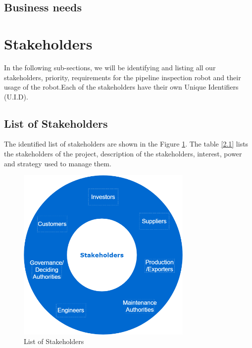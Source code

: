 \documentclass[a4paper,table]{article}
\begin{document}
 \subsection{Business needs}
\section{Stakeholders}
In the following sub-sections, we will be identifying and listing all our stakeholders, priority, requirements for the pipeline inspection robot and their usage of the robot.Each of the stakeholders have their own Unique Identifiers (U.I.D). 
\subsection{List of Stakeholders}
The identified list of stakeholders are shown in the Figure \ref{fig:2.1}. The table \ref{2.1} lists the stakeholders of the project, description of the stakeholders, interest, power and strategy used to manage them.\\
\begin{figure}[htbp]
    \centerline{\includegraphics[width=8.5cm]{Stakeholders.png}}
    \caption{List of Stakeholders}
    \label{fig:2.1}
\end{figure}
\end{document}
